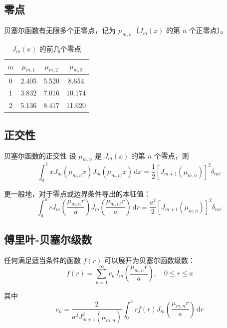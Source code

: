 \subsection{零点}

贝塞尔函数有无限多个正零点，记为 $\mu_{m,n}$（$J_m(x)$ 的第 $n$ 个正零点）。

\begin{table}[htbp]
\centering
\begin{tabular}{cccc}
\toprule
$m$ & $\mu_{m,1}$ & $\mu_{m,2}$ & $\mu_{m,3}$ \\
\midrule
0 & 2.405 & 5.520 & 8.654 \\
1 & 3.832 & 7.016 & 10.174 \\
2 & 5.136 & 8.417 & 11.620 \\
\bottomrule
\end{tabular}
\caption{$J_m(x)$ 的前几个零点}
\end{table}

\subsection{正交性}

\begin{dingli}{贝塞尔函数的正交性}{}
设 $\mu_{m,n}$ 是 $J_m(x)$ 的第 $n$ 个零点，则
\[
    \int_0^1 xJ_m(\mu_{m,n}x)J_m(\mu_{m,n'}x)\,\mathrm{d}x = \frac{1}{2}[J_{m+1}(\mu_{m,n})]^2\delta_{nn'}
\]
\end{dingli}

更一般地，对于零点或边界条件导出的本征值：
\begin{equation}
    \int_0^a rJ_m\left(\frac{\mu_{m,n}r}{a}\right)J_m\left(\frac{\mu_{m,n'}r}{a}\right)\,\mathrm{d}r = \frac{a^2}{2}[J_{m+1}(\mu_{m,n})]^2\delta_{nn'}
\end{equation}

\subsection{傅里叶-贝塞尔级数}

任何满足适当条件的函数 $f(r)$ 可以展开为贝塞尔函数级数：
\begin{equation}
    f(r) = \sum_{n=1}^{\infty} c_n J_m\left(\frac{\mu_{m,n}r}{a}\right), \quad 0 \leq r \leq a
\end{equation}

其中
\begin{equation}
    \boxed{c_n = \frac{2}{a^2J_{m+1}^2(\mu_{m,n})}\int_0^a rf(r)J_m\left(\frac{\mu_{m,n}r}{a}\right)\,\mathrm{d}r}
\end{equation}

